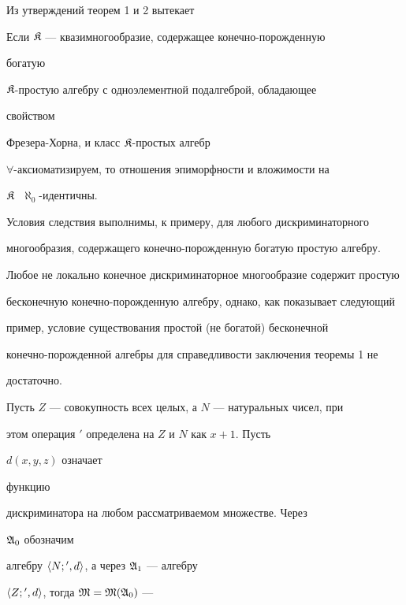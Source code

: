 Из утверждений теорем 1 и 2 вытекает





\begin{cornonum}


Если $\frak K$ --- квазимногообразие, содержащее конечно-порожденную


богатую


$\frak K$-простую алгебру с одноэлементной подалгеброй, обладающее


свойством


Фрезера-Хорна, и класс $\frak K$-простых алгебр


$\forall$-аксиоматизируем, то отношения эпиморфности и вложимости на


$\frak K\;$ $\aleph_0$-идентичны.


\end{cornonum}





Условия следствия выполнимы, к примеру, для любого дискриминаторного


многообразия, содержащего конечно-порожденную богатую простую алгебру.





Любое не локально конечное дискриминаторное многообразие содержит простую


бесконечную конечно-порожденную алгебру, однако, как показывает следующий


пример, условие существования простой (не богатой) бесконечной


конечно-порожденной алгебры для справедливости заключения теоремы 1 не


достаточно.





Пусть $Z$ --- совокупность всех целых, а $N$ --- натуральных чисел, при


этом операция ${}'$ определена на $Z$ и $N$ как $x+1$. Пусть


$d(x,y,z)$ означает


функцию


дискриминатора на любом рассматриваемом множестве. Через


$\frak A_0$ обозначим


алгебру $\langle N;{}',d\rangle$, а через $\frak A_1$ --- алгебру


$\langle Z;{}',d\rangle$, тогда $\frak M=\frak M(\frak A_0)$ ---


